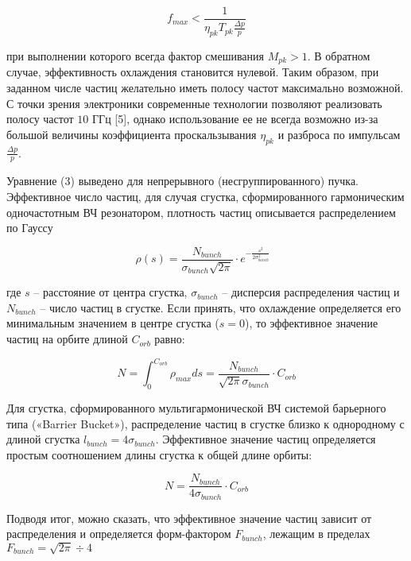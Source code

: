\begin{equation}
f_{max}<\frac{1}{\eta_{pk}T_{pk}\frac{\Delta p}{p}}
\end{equation}	

\noindent при выполнении которого всегда фактор смешивания $M_{pk}>1$. В обратном случае, эффективность охлаждения становится нулевой. Таким образом, при заданном числе частиц желательно иметь полосу частот максимально возможной. С точки зрения электроники современные технологии позволяют реализовать полосу частот $10$ ГГц [5], однако использование ее не всегда возможно из-за большой величины коэффициента проскальзывания $\eta_{pk}$ и разброса по импульсам $\frac{\Delta p}{p}$.

\noindent Уравнение (3) выведено для непрерывного (несгруппированного) пучка.  Эффективное число частиц, для случая сгустка, сформированного гармоническим одночастотным ВЧ резонатором, плотность частиц описывается распределением по Гауссу

\begin{equation}
\rho(s)=\frac{N_{bunch}}{\sigma_{bunch}\sqrt{2\pi}}\cdot e^{-\frac{s^2}{2\sigma_{bunch}^2}}\ \ \ 
\end{equation}	

\noindent где $s$ – расстояние от центра сгустка, $\sigma_{bunch}$ – дисперсия распределения частиц и $N_{bunch}$ – число частиц в сгустке. Если принять, что охлаждение определяется его минимальным значением в центре сгустка ($s=0$), то эффективное значение частиц на орбите длиной $C_{orb}$ равно:

\begin{equation}
N=\int_{0}^{C_{orb}}{\rho_{max}ds}=\frac{N_{bunch}}{\sqrt{2\pi}\sigma_{bunch}}\cdot C_{orb}
\end{equation}

\noindent Для сгустка, сформированного мультигармонической ВЧ системой барьерного типа («Barrier Bucket»), распределение частиц в сгустке близко к однородному с длиной сгустка $l_{bunch}=4\sigma_{bunch}$. Эффективное значение частиц определяется простым соотношением длины сгустка к общей длине орбиты:

\begin{equation}
N=\frac{N_{bunch}}{{4\sigma}_{bunch}}\cdot C_{orb}
\end{equation}

\noindent Подводя итог, можно сказать, что эффективное значение частиц зависит от распределения и определяется форм-фактором $F_{bunch}$, лежащим в пределах $F_{bunch}=\sqrt{2\pi}\div4$

